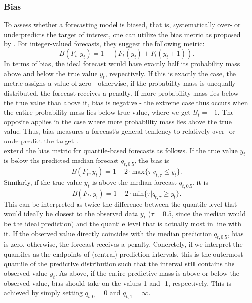 \subsubsection{Bias}
To assess whether a forecasting model is biased, that is, systematically over- or underpredicts the target of interest, one can utilize the bias metric as proposed by \cite{funk_assessing_nodate}. For integer-valued forecasts, they suggest the following metric:
\begin{equation*}
B(F_t, y_t) = 1 - (F_t(y_t) + F_t(y_t + 1)).
\end{equation*}
In terms of bias, the ideal forecast would have exactly half its probability mass above and below the true value $y_t$, respectively. If this is exactly the case, the metric assigns a value of zero - otherwise, if the probability mass is unequally distributed, the forecast receives a penalty. If more probability mass lies below  the true value than above it, bias is negative - the extreme case thus occurs when the entire probability mass lies below true value, where we get $B_t = -1$. The opposite applies in the case where more probability mass lies above the true value. Thus, bias measures a forecast's general tendency to relatively over- or underpredict the target \cite{bosse_evaluating_2022}.\\
\cite{bosse_evaluating_2022} extend the bias metric for quantile-based forecasts as follows. If the true value $y_t$ is below the predicted median forecast $q_{t,0.5}$, the bias is 
\begin{equation*}
B(F_t, y_t) = 1 - 2 \cdot \text{max}\{\tau | q_{t,\tau} \leq y_t \}.
\end{equation*}
Similarly, if the true value $y_t$ is above the median forecast $q_{t,0.5}$, it is
\begin{equation*}
B(F_t, y_t) = 1 - 2 \cdot \text{min}\{\tau | q_{t,\tau} \geq y_t \}.
\end{equation*}
This can be interpreted as twice the difference between the quantile level that would ideally be closest to the observed data $y_t$ ($\tau = 0.5$, since the median would be the ideal prediction) and the quantile level that is actually most in line with it. If the observed value directly coincides with the median prediction $q_{t, 0.5}$, bias is zero, otherwise, the forecast receives a penalty. Concretely, if we interpret the quantiles as the endpoints of (central) prediction intervals, this is the outermost quantile of the predictive distribution such that the interval still contains the observed value $y_t$. As above, if the entire predictive mass is above or below the observed value, bias should take on the values 1 and -1, respectively. This is achieved by simply setting $q_{t,0} = 0$ and $q_{t,1} = \infty$.\\
